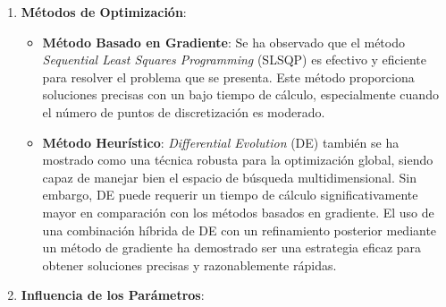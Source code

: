 \begin{enumerate}
    \item \textbf{Métodos de Optimización}:
    \begin{itemize}
        \item \textbf{Método Basado en Gradiente}: Se ha observado que el método \textit{Sequential Least Squares Programming} (SLSQP) es efectivo y eficiente para resolver el problema que se presenta. Este método proporciona soluciones precisas con un bajo tiempo de cálculo, especialmente cuando el número de puntos de discretización es moderado.
        \item \textbf{Método Heurístico}: \textit{Differential Evolution} (DE) también se ha mostrado como una técnica robusta para la optimización global, siendo capaz de manejar bien el espacio de búsqueda multidimensional. Sin embargo, DE puede requerir un tiempo de cálculo significativamente mayor en comparación con los métodos basados en gradiente. El uso de una combinación híbrida de DE con un refinamiento posterior mediante un método de gradiente ha demostrado ser una estrategia eficaz para obtener soluciones precisas y razonablemente rápidas.
    \end{itemize}
    
    
    \item \textbf{Influencia de los Parámetros}:


\end{enumerate}
